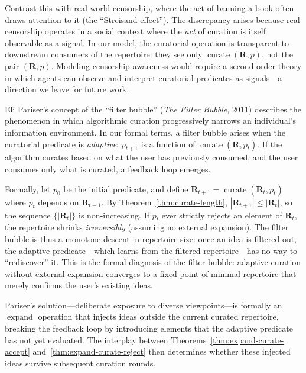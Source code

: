 Contrast this with real-world censorship, where the act of banning a
book often draws attention to it (the ``Streisand effect'').  The
discrepancy arises because real censorship operates in a social context
where the \emph{act} of curation is itself observable as a signal.  In
our model, the curatorial operation is transparent to downstream
consumers of the repertoire: they see only
$\operatorname{curate}(\mathbf{R}, p)$, not the pair
$(\mathbf{R}, p)$.  Modeling censorship-awareness would require a
second-order theory in which agents can observe and interpret curatorial
predicates as signals---a direction we leave for future work.

\begin{remark}
\label{rem:filter-bubble}
Eli Pariser's concept of the ``filter bubble'' (\textit{The Filter
Bubble}, 2011) describes the phenomenon in which algorithmic curation
progressively narrows an individual's information environment.  In our
formal terms, a filter bubble arises when the curatorial predicate is
\emph{adaptive}: $p_{t+1}$ is a function of
$\operatorname{curate}(\mathbf{R}, p_t)$.  If the algorithm curates
based on what the user has previously consumed, and the user consumes
only what is curated, a feedback loop emerges.

Formally, let $p_0$ be the initial predicate, and define
$\mathbf{R}_{t+1} = \operatorname{curate}(\mathbf{R}_t, p_t)$ where
$p_t$ depends on $\mathbf{R}_{t-1}$.  By Theorem~\ref{thm:curate-length},
$|\mathbf{R}_{t+1}| \le |\mathbf{R}_t|$, so the sequence
$\{|\mathbf{R}_t|\}$ is non-increasing.  If $p_t$ ever strictly
rejects an element of $\mathbf{R}_t$, the repertoire shrinks
\emph{irreversibly} (assuming no external expansion).  The filter
bubble is thus a monotone descent in repertoire size: once an idea is
filtered out, the adaptive predicate---which learns from the filtered
repertoire---has no way to ``rediscover'' it.  This is the formal
diagnosis of the filter bubble: adaptive curation without external
expansion converges to a fixed point of minimal repertoire that merely
confirms the user's existing ideas.

Pariser's solution---deliberate exposure to diverse viewpoints---is
formally an $\operatorname{expand}$ operation that injects ideas outside
the current curated repertoire, breaking the feedback loop by
introducing elements that the adaptive predicate has not yet evaluated.
The interplay between Theorems~\ref{thm:expand-curate-accept}
and~\ref{thm:expand-curate-reject} then determines whether these
injected ideas survive subsequent curation rounds.
\end{remark}

